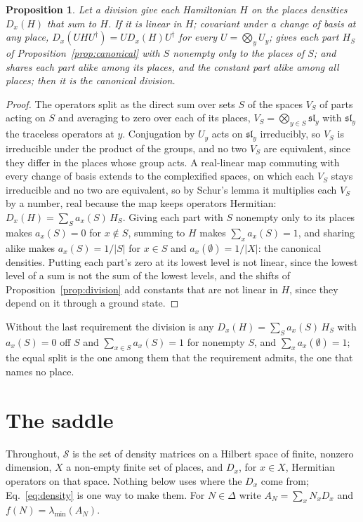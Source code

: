 \documentclass[aps,prd,reprint,superscriptaddress]{revtex4-2}
\newtheorem{proposition}{Proposition}
\begin{document}
\begin{proposition}\label{prop:unique}
Let a division give each Hamiltonian $H$ on the places densities $D_x(H)$ that sum to $H$. If it is linear in $H$; covariant under a change of basis at any place, $D_x(UHU^\dagger) = U D_x(H) U^\dagger$ for every $U = \bigotimes_y U_y$; gives each part $H_S$ of Proposition~\ref{prop:canonical} with $S$ nonempty only to the places of $S$; and shares each part alike among its places, and the constant part alike among all places; then it is the canonical division.
\end{proposition}
\begin{proof}
The operators split as the direct sum over sets $S$ of the spaces $V_S$ of parts acting on $S$ and averaging to zero over each of its places, $V_S = \bigotimes_{y \in S} \mathfrak{sl}_y$ with $\mathfrak{sl}_y$ the traceless operators at $y$. Conjugation by $U_y$ acts on $\mathfrak{sl}_y$ irreducibly, so $V_S$ is irreducible under the product of the groups, and no two $V_S$ are equivalent, since they differ in the places whose group acts. A real-linear map commuting with every change of basis extends to the complexified spaces, on which each $V_S$ stays irreducible and no two are equivalent, so by Schur's lemma it multiplies each $V_S$ by a number, real because the map keeps operators Hermitian: $D_x(H) = \sum_S a_x(S)\, H_S$. Giving each part with $S$ nonempty only to its places makes $a_x(S) = 0$ for $x \notin S$, summing to $H$ makes $\sum_x a_x(S) = 1$, and sharing alike makes $a_x(S) = 1/|S|$ for $x \in S$ and $a_x(\emptyset) = 1/|X|$: the canonical densities. Putting each part's zero at its lowest level is not linear, since the lowest level of a sum is not the sum of the lowest levels, and the shifts of Proposition~\ref{prop:division} add constants that are not linear in $H$, since they depend on it through a ground state.
\end{proof}
Without the last requirement the division is any $D_x(H) = \sum_S a_x(S)\, H_S$ with $a_x(S) = 0$ off $S$ and $\sum_{x \in S} a_x(S) = 1$ for nonempty $S$, and $\sum_x a_x(\emptyset) = 1$; the equal split is the one among them that the requirement admits, the one that names no place.

\section{The saddle}
\label{app:saddle}

Throughout, $\mathcal S$ is the set of density matrices on a Hilbert space of finite, nonzero dimension, $X$ a non-empty finite set of places, and $D_x$, for $x \in X$, Hermitian operators on that space. Nothing below uses where the $D_x$ come from; Eq.~\eqref{eq:density} is one way to make them. For $N \in \Delta$ write $A_N = \sum_x N_x D_x$ and $f(N) = \lambda_{\min}(A_N)$.
\end{document}

